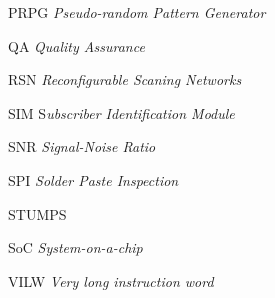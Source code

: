 \begin{siglas}
    \item [PRPG] \textit{Pseudo-random Pattern Generator}
    \item [QA] \textit{Quality Assurance}
    \item [RSN] \textit{Reconfigurable Scaning Networks}
    \item [SIM] S\textit{ubscriber Identification Module}
    \item [SNR] \textit{Signal-Noise Ratio}
    \item [SPI] \textit{Solder Paste Inspection}
    \item [STUMPS] 
    \item [SoC] \textit{System-on-a-chip}
    \item [VILW] \textit{Very long instruction word}
    
\end{siglas}


\tableofcontents*
\cleardoublepage


\textual
